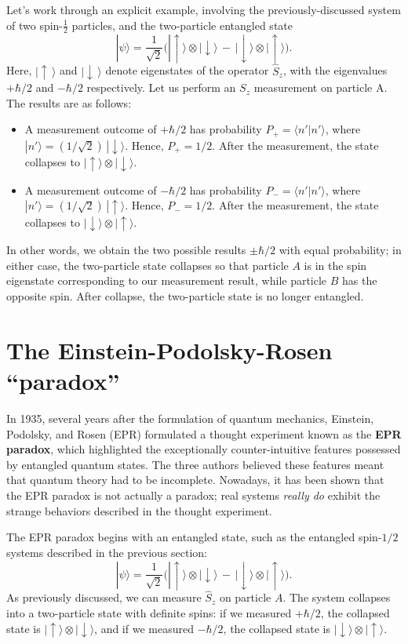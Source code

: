 \documentclass[pra,11pt]{revtex4}
\begin{document}
Let's work through an explicit example, involving the
previously-discussed system of two spin-$\frac{1}{2}$ particles, and
the two-particle entangled state
$$|\psi\rangle = \frac{1}{\sqrt{2}} \Big(|\!\uparrow\rangle\otimes|\!\downarrow\rangle \,-\, |\!\downarrow\rangle\otimes|\!\uparrow\rangle\Big).$$
Here, $|\!\uparrow\,\rangle$ and $|\!\downarrow\,\rangle$ denote eigenstates
of the operator $\hat{S}_z$, with the eigenvalues $+\hbar/2$ and $-\hbar/2$
respectively.  Let us perform an $S_z$ measurement on particle A.  The
results are as follows:
\begin{itemize}
\item A measurement outcome of $+\hbar/2$ has probability $P_+ = \langle
  n'|n'\rangle$, where $|n'\rangle =
  (1/\sqrt{2})\,|\!\downarrow\rangle$.  Hence, $P_+ = 1/2$.  After the
  measurement, the state collapses to $|\!\uparrow\rangle
  \otimes|\!\downarrow\rangle$.

\item A measurement outcome of $-\hbar/2$ has probability $P_- = \langle
  n'|n'\rangle$, where $|n'\rangle =
  (1/\sqrt{2})\,|\!\uparrow\rangle$.  Hence, $P_- = 1/2$.  After the
  measurement, the state collapses to $|\!\downarrow\rangle
  \otimes|\!\uparrow\rangle$.
\end{itemize}
In other words, we obtain the two possible results $\pm \hbar/2$ with
equal probability; in either case, the two-particle state collapses so
that particle $A$ is in the spin eigenstate corresponding to our
measurement result, while particle $B$ has the opposite spin.  After
collapse, the two-particle state is no longer entangled.

\section{The Einstein-Podolsky-Rosen ``paradox''}

In 1935, several years after the formulation of quantum mechanics,
Einstein, Podolsky, and Rosen (EPR) formulated a thought experiment
known as the \textbf{EPR paradox}, which highlighted the exceptionally
counter-intuitive features possessed by entangled quantum states.  The
three authors believed these features meant that quantum theory had to
be incomplete.  Nowadays, it has been shown that the EPR paradox is
not actually a paradox; real systems \textit{really do} exhibit the
strange behaviors described in the thought experiment.

The EPR paradox begins with an entangled state, such as the entangled
spin-$1/2$ systems described in the previous section:
$$|\psi\rangle = \frac{1}{\sqrt{2}} \Big(|\!\uparrow\rangle\otimes|\!\downarrow\rangle \,-\, |\!\downarrow\rangle\otimes|\!\uparrow\rangle\Big).$$
As previously discussed, we can measure $\hat{S}_z$ on particle $A$.
The system collapses into a two-particle state with definite spins: if
we measured $+\hbar/2$, the collapsed state is $|\!\uparrow\rangle
\otimes|\!\downarrow\rangle$, and if we measured $-\hbar/2$, the collapsed
state is $|\!\downarrow\rangle\otimes|\!\uparrow\rangle$.
\end{document}
